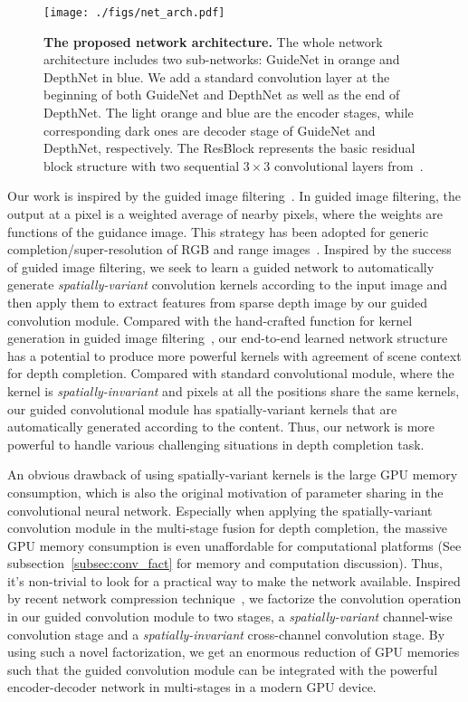 \documentclass[journal]{IEEEtran}
\begin{document}
\begin{figure*}
\begin{center}
\texttt{[image: ./figs/net\_arch.pdf]}
\end{center}
   \caption{{\bf The proposed network architecture.}
   The whole network architecture includes two sub-networks: GuideNet in orange and DepthNet in blue.
   We add a standard convolution layer at the beginning of both GuideNet and DepthNet as well as the end of DepthNet.
   The light orange and blue are the encoder stages, while corresponding dark ones are decoder stage of GuideNet and DepthNet, respectively.
   The ResBlock represents the basic residual block structure with two sequential $3\times3$ convolutional layers from~\cite{res_net}. }
\label{fig:net_arch}
\end{figure*}


Our work is inspired by the guided image filtering~\cite{guided_filter, bilateral_filter}.
In guided image filtering, the output at a pixel is a weighted average of nearby pixels, where the weights are functions of the guidance image.
This strategy has been adopted for generic completion/super-resolution of RGB and range images~\cite{joint_upsampling, spatial_depth_range, joint_geodesic_upsampling}.
Inspired by the success of guided image filtering, we seek to learn a guided network
to automatically generate \emph{spatially-variant} convolution kernels according to the input image and then apply them to
extract features from sparse depth image by our guided convolution module.
Compared with the hand-crafted function for kernel generation in guided image filtering~\cite{guided_filter},
our end-to-end learned network structure has a potential to produce more powerful kernels with agreement of scene context for depth completion. 
Compared with standard convolutional module, where the kernel is \emph{spatially-invariant} and pixels at all the positions share the same kernels,
our guided convolutional module has spatially-variant kernels that are automatically generated according to the content.
Thus, our network is more powerful to handle various challenging situations in depth completion task.

An obvious drawback of using spatially-variant kernels is the large GPU memory consumption, which is also the original motivation of parameter sharing in the convolutional neural network.
Especially when applying the spatially-variant convolution module in the multi-stage fusion for depth completion,
the massive GPU memory consumption is even unaffordable for computational platforms
(See subsection~\ref{subsec:conv_fact} for memory and computation discussion).
Thus, it's non-trivial to look for a practical way to make the network available.
Inspired by recent network compression technique~\cite{MobileNets}, we factorize the convolution operation in our guided convolution module to two stages,
a \emph{spatially-variant} channel-wise convolution stage and a \emph{spatially-invariant} cross-channel convolution stage.
By using such a novel factorization,
we get an enormous reduction of GPU memories such that the guided convolution module can be integrated with the powerful encoder-decoder network in multi-stages in a modern GPU device.
\end{document}
